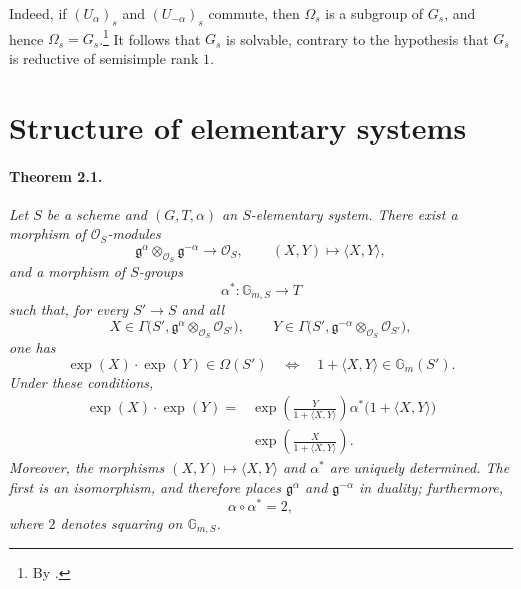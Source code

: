 Indeed, if \((U_\alpha)_s\) and \((U_{-\alpha})_s\) commute, then
\(\Omega_s\) is a subgroup of \(G_s\), and hence
\(\Omega_s=G_s\).\footnote{By .} It follows that \(G_s\) is
solvable, contrary to the hypothesis that \(G_s\) is reductive of
semisimple rank \(1\).



\section{Structure of elementary systems}

\paragraph{\textbf{Theorem 2.1.}}
\emph{Let \(S\) be a scheme and \((G,T,\alpha)\) an
\(S\)-elementary system. There exist a morphism of
\(\mathscr O_S\)-modules}
\[
  \mathfrak g^\alpha\otimes_{\mathscr O_S}\mathfrak g^{-\alpha}
    \longrightarrow\mathscr O_S,
  \qquad
  (X,Y)\longmapsto\langle X,Y\rangle,
\]
\emph{and a morphism of \(S\)-groups}
\[
  \alpha^\ast\colon\mathbb G_{m,S}\longrightarrow T
\]
\emph{such that, for every \(S'\to S\) and all}
\[
  X\in\Gamma\bigl(S',
    \mathfrak g^\alpha\otimes_{\mathscr O_S}\mathscr O_{S'}\bigr),
  \qquad
  Y\in\Gamma\bigl(S',
    \mathfrak g^{-\alpha}\otimes_{\mathscr O_S}\mathscr O_{S'}\bigr),
\]
\emph{one has}
\[
  \exp(X)\mathbin{\cdot}\exp(Y)\in\Omega(S')
  \quad\Longleftrightarrow\quad
  1+\langle X,Y\rangle\in\mathbb G_m(S').
\]
\emph{Under these conditions,}
\begin{equation}\tag{F}
\begin{aligned}
  \exp(X)\mathbin{\cdot}\exp(Y)
   ={}&\exp\left(\frac{Y}{1+\langle X,Y\rangle}\right)
       \alpha^\ast\bigl(1+\langle X,Y\rangle\bigr)\\
     &{}\exp\left(\frac{X}{1+\langle X,Y\rangle}\right).
\end{aligned}
\end{equation}
\emph{Moreover, the morphisms
\((X,Y)\mapsto\langle X,Y\rangle\) and \(\alpha^\ast\) are uniquely
determined. The first is an isomorphism, and therefore places
\(\mathfrak g^\alpha\) and \(\mathfrak g^{-\alpha}\) in duality;
furthermore,}
\[
  \alpha\circ\alpha^\ast=2,
\]
\emph{where \(2\) denotes squaring on \(\mathbb G_{m,S}\).}

